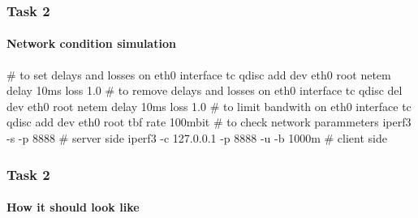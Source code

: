 \begin{frame}[fragile]
	\frametitle{Task 2}
	\framesubtitle{Network condition simulation}
	
	
	\begin{semiverbatim}
		# to set delays and losses on eth0 interface
		tc qdisc add dev eth0 root netem delay 10ms loss 1.0%
		# to remove delays and losses on eth0 interface
		tc qdisc del dev eth0 root netem delay 10ms loss 1.0%
		# to limit bandwith on eth0 interface
		tc qdisc add dev eth0 root tbf rate 100mbit
		# to check network parammeters
		iperf3 -s -p 8888 # server side
		iperf3 -c 127.0.0.1 -p 8888 -u -b 1000m # client side
	\end{semiverbatim}



\end{frame}


\begin{frame}[fragile]
	\frametitle{Task 2}
	\framesubtitle{How it should look like}
	
	\begin{figure}[H]
	\end{figure}
	
\end{frame}

